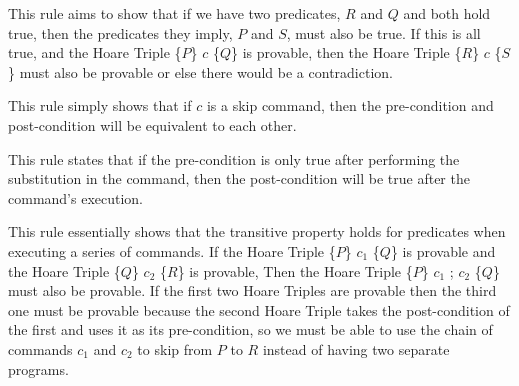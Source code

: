 \documentclass{lecturenotes}
\begin{document}
\noindent This rule aims to show that if we have two predicates, $R$ and $Q$ and both hold true, then the predicates they imply, $P$ and $S$, must also be true. \newline
If this is all true, and the Hoare Triple \{$P$\} $c$ \{$Q$\} is provable, then the Hoare Triple \{$R$\} $c$ \{$S$\} must also be provable or else there would be a contradiction. \newline

\begin{mathpar}
\end{mathpar}

\noindent This rule simply shows that if $c$ is a skip command, then the pre-condition and post-condition will be equivalent to each other. \newline

\begin{mathpar}
\end{mathpar}

\noindent This rule states that if the pre-condition is only true after performing the substitution in the command, then the post-condition will be true after the command's execution. \newline

\begin{mathpar}
\end{mathpar}

\noindent This rule essentially shows that the transitive property holds for predicates when executing a series of commands. \newline
If the Hoare Triple \{$P$\} $c_1$ \{$Q$\} is provable and the Hoare Triple \{$Q$\} $c_2$ \{$R$\} is provable, \newline
Then the Hoare Triple \{$P$\} $c_1$ ; $c_2$ \{$Q$\} must also be provable. \newline
If the first two Hoare Triples are provable then the third one must be provable because the second Hoare Triple takes the post-condition of the first and uses it as its pre-condition,
so we must be able to use the chain of commands $c_1$ and $c_2$ to skip from $P$ to $R$ instead of having two separate programs.
\newpage
\end{document}
